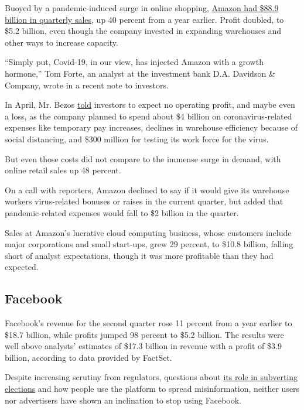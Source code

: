 Buoyed by a pandemic-induced surge in online shopping,
\href{https://www.nytimes3xbfgragh.onion/2020/05/22/technology/amazon-coronavirus-target-walmart.html}{Amazon
had \$88.9 billion in quarterly sales}, up 40 percent from a year
earlier. Profit doubled, to \$5.2 billion, even though the company
invested in expanding warehouses and other ways to increase capacity.

``Simply put, Covid-19, in our view, has injected Amazon with a growth
hormone,'' Tom Forte, an analyst at the investment bank D.A. Davidson \&
Company, wrote in a recent note to investors.

In April, Mr. Bezos
\href{https://www.nytimes3xbfgragh.onion/2020/04/30/technology/amazon-stock-earnings-report.html}{told}
investors to expect no operating profit, and maybe even a loss, as the
company planned to spend about \$4 billion on coronavirus-related
expenses like temporary pay increases, declines in warehouse efficiency
because of social distancing, and \$300 million for testing its work
force for the virus.

But even those costs did not compare to the immense surge in demand,
with online retail sales up 48 percent.

On a call with reporters, Amazon declined to say if it would give its
warehouse workers virus-related bonuses or raises in the current
quarter, but added that pandemic-related expenses would fall to \$2
billion in the quarter.

Sales at Amazon's lucrative cloud computing business, whose customers
include major corporations and small start-ups, grew 29 percent, to
\$10.8 billion, falling short of analyst expectations, though it was
more profitable than they had expected.

\hypertarget{facebook}{%
\subsection{Facebook}\label{facebook}}

Facebook's revenue for the second quarter rose 11 percent from a year
earlier to \$18.7 billion, while profits jumped 98 percent to \$5.2
billion. The results were well above analysts' estimates of \$17.3
billion in revenue with a profit of \$3.9 billion, according to data
provided by FactSet.

Despite increasing scrutiny from regulators, questions about
\href{https://slack-redir.net/link?url=https\%3A\%2F\%2Fwww.nytimes3xbfgragh.onion\%2F2018\%2F02\%2F17\%2Ftechnology\%2Findictment-russian-tech-facebook.html}{its
role in subverting elections} and how people use the platform to spread
misinformation, neither users nor advertisers have shown an inclination
to stop using Facebook.

